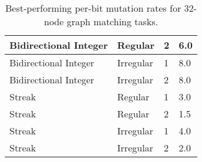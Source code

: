 \begin{table}[]
\begin{tabular}{l|l|l|l}
Bidirectional Integer & Regular                   & 2                      & 6.0                                            \\ \hline
Bidirectional Integer & Irregular                 & 1                      & 8.0                                            \\ \hline
Bidirectional Integer & Irregular                 & 2                      & 8.0                                            \\ \hline
Streak                & Regular                   & 1                      & 3.0                                            \\ \hline
Streak                & Regular                   & 2                      & 1.5                                            \\ \hline
Streak                & Irregular                 & 1                      & 4.0                                            \\ \hline
Streak                & Irregular                 & 2                      & 2.0
\end{tabular}

\caption{
Best-performing per-bit mutation rates for 32-node graph matching tasks.
}
\label{tab:evo_graph_mut}

\end{table}
